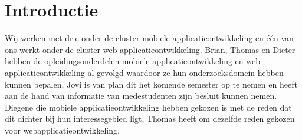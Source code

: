 \documentclass[fleqn,10pt]{voorstel}
\begin{document}
\flushbottom %

\maketitle %

\tableofcontents %

\thispagestyle{empty} %


\section{Introductie} %
Wij werken met drie onder de cluster mobiele applicatieontwikkeling en één van ons werkt onder de cluster web applicatieontwikkeling. Brian, Thomas en Dieter hebben de opleidingsonderdelen mobiele applicatieontwikkeling en web applicatieontwikkeling
al gevolgd waardoor ze hun onderzoeksdomein hebben kunnen bepalen, Jovi is van plan dit het komende semester op te nemen en heeft aan de hand van informatie van medestudenten zijn besluit kunnen nemen.
Diegene die mobiele applicatieontwikkeling hebben gekozen is met de reden dat dit dichter bij hun interessegebied ligt, Thomas heeft om dezelfde reden gekozen voor webapplicatieontwikkeling.
\end{document}
